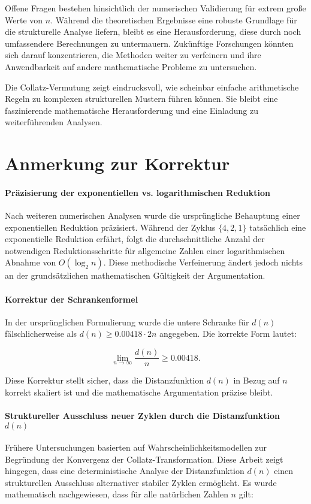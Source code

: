 \documentclass[a4paper,12pt]{article}
\begin{document}
Offene Fragen bestehen hinsichtlich der numerischen Validierung für extrem große Werte von \( n \). Während die theoretischen Ergebnisse eine robuste Grundlage für die strukturelle Analyse liefern, bleibt es eine Herausforderung, diese durch noch umfassendere Berechnungen zu untermauern. Zukünftige Forschungen könnten sich darauf konzentrieren, die Methoden weiter zu verfeinern und ihre Anwendbarkeit auf andere mathematische Probleme zu untersuchen.

Die Collatz-Vermutung zeigt eindrucksvoll, wie scheinbar einfache arithmetische Regeln zu komplexen strukturellen Mustern führen können. Sie bleibt eine faszinierende mathematische Herausforderung und eine Einladung zu weiterführenden Analysen.

\section*{Anmerkung zur Korrektur}  

\paragraph{Präzisierung der exponentiellen vs. logarithmischen Reduktion}  
Nach weiteren numerischen Analysen wurde die ursprüngliche Behauptung einer exponentiellen Reduktion präzisiert. Während der Zyklus \( \{4,2,1\} \) tatsächlich eine exponentielle Reduktion erfährt, folgt die durchschnittliche Anzahl der notwendigen Reduktionsschritte für allgemeine Zahlen einer logarithmischen Abnahme von \( O(\log_2 n) \). Diese methodische Verfeinerung ändert jedoch nichts an der grundsätzlichen mathematischen Gültigkeit der Argumentation.

\paragraph{Korrektur der Schrankenformel}  
In der ursprünglichen Formulierung wurde die untere Schranke für \( d(n) \) fälschlicherweise als \( d(n) \geq 0.00418 \cdot 2n \) angegeben. Die korrekte Form lautet:

\[
\lim_{n \to \infty} \frac{d(n)}{n} \geq 0.00418.
\]

Diese Korrektur stellt sicher, dass die Distanzfunktion \( d(n) \) in Bezug auf \( n \) korrekt skaliert ist und die mathematische Argumentation präzise bleibt.

\paragraph{Struktureller Ausschluss neuer Zyklen durch die Distanzfunktion \( d(n) \)}  
Frühere Untersuchungen basierten auf Wahrscheinlichkeitsmodellen zur Begründung der Konvergenz der Collatz-Transformation. Diese Arbeit zeigt hingegen, dass eine deterministische Analyse der Distanzfunktion \( d(n) \) einen strukturellen Ausschluss alternativer stabiler Zyklen ermöglicht. Es wurde mathematisch nachgewiesen, dass für alle natürlichen Zahlen \( n \) gilt:
\end{document}
